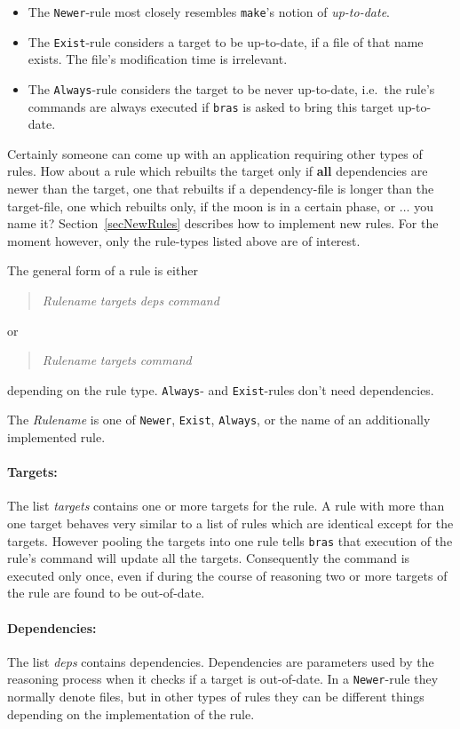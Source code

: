\documentclass[12pt]{article}
\newcommand{\bras}{\texttt{bras}}
\newcommand{\make}{\texttt{make}}
\begin{document}
\begin{itemize}
\item 
The \texttt{Newer}-rule most closely resembles \make's notion of
\textit{up-to-date}.
\item 
The \texttt{Exist}-rule considers a target to be up-to-date,
if a file of that name exists. The file's modification time is irrelevant.
\item 
The \texttt{Always}-rule considers the target to be never
up-to-date, i.e.\ the rule's commands are always executed if
\bras{} is asked to bring this target up-to-date.
\end{itemize}

Certainly someone can come up with an application requiring other
types of rules. How about a rule which rebuilts
the target only if \textbf{all} dependencies are newer than the
target, one that rebuilts if a dependency-file is longer than the
target-file, one which rebuilts only, if the moon is in a certain
phase, or $\ldots$ you name it?  Section~\ref{secNewRules} describes
how to implement new rules. For the moment however, only the
rule-types listed above are of interest.

The general form of a rule is
either
\begin{quote}
\textit{Rulename} \textit{targets} \textit{deps} \textit{command}
\end{quote}
or
\begin{quote}
\textit{Rulename} \textit{targets} \textit{command}
\end{quote}
depending on the rule type. \texttt{Always}- and \texttt{Exist}-rules
don't need dependencies.

The \textit{Rulename} is one of \texttt{Newer}, \texttt{Exist},
\texttt{Always}, or the name of an additionally implemented rule.

\paragraph{Targets:}
The list \textit{targets} contains one or more targets for the rule. A
rule with more than one target behaves very similar to a list of rules
which are identical except for the targets. However pooling the
targets into one rule tells \bras{} that execution of the rule's
command will update all the targets. Consequently the command
is executed only once, even if during the course of reasoning two or
more targets of the rule are found to be out-of-date.

\paragraph{Dependencies:}
The list \textit{deps} contains dependencies. Dependencies are
parameters used by the reasoning process when it checks if a target is
out-of-date. In a \texttt{Newer}-rule they normally denote files, but
in other types of rules they can be different things depending on the
implementation of the rule.
\end{document}
